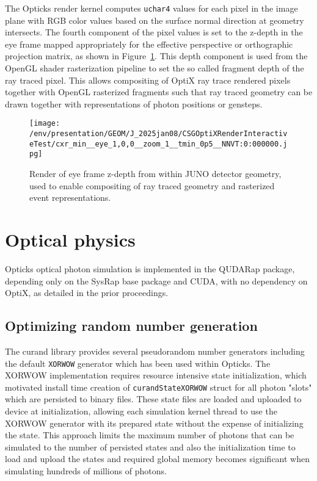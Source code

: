 \documentclass{webofc}
\begin{document}
The Opticks render kernel computes {\tt uchar4} values for each pixel in the image 
plane with RGB color values based on the surface normal direction at geometry intersects. 
The fourth component of the pixel values is set to the z-depth in the eye frame 
mapped appropriately for the effective perspective or orthographic projection matrix, 
as shown in Figure~\ref{depth}.  
This depth component is used from the OpenGL shader rasterization pipeline to set the 
so called fragment depth of the ray traced pixel. This allows compositing of OptiX ray 
trace rendered pixels together with OpenGL rasterized fragments such that 
ray traced geometry can be drawn together with representations of photon positions or gensteps.
%
%
\begin{figure}
\centering
\texttt{[image: /env/presentation/GEOM/J\_2025jan08/CSGOptiXRenderInteractiveTest/cxr\_min\_\_eye\_1,0,0\_\_zoom\_1\_\_tmin\_0p5\_\_NNVT:0:000000.jpg]}
\caption{Render of eye frame z-depth from within JUNO detector geometry, used to enable compositing of ray traced geometry and rasterized event representations.}  
\label{depth}
\vspace{-5mm}
\end{figure}%
%
% 
\section{Optical physics}%
%
Opticks optical photon simulation is implemented in the QUDARap package, 
depending only on the SysRap base package and CUDA, with no dependency on OptiX,
as detailed in the prior proceedings\cite{chep2023}.
%
\subsection{Optimizing random number generation}
%
The curand library\cite{curandURL}  provides several pseudorandom number generators
including the default {\tt XORWOW} generator which has been used within Opticks.  
The XORWOW implementation requires resource intensive state initialization, which 
motivated install time creation of {\tt curandStateXORWOW} struct for all photon "slots" 
which are persisted to binary files. 
These state files are loaded and uploaded to device at initialization,  
allowing each simulation kernel thread to use the XORWOW generator with its 
prepared state without the expense of initializing the state. 
This approach limits the maximum number of photons 
that can be simulated to the number of persisted states and also the initialization time 
to load and upload the states and required global memory becomes significant when simulating 
hundreds of millions of photons. 
\end{document}
